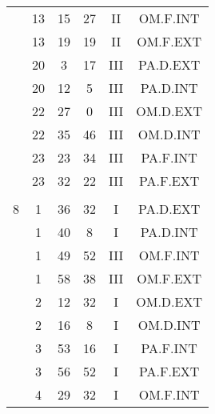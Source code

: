 \documentclass[12pt, a4paper]{article}
\begin{document}
\begin{multicols}{3}
{\begin{tabular}{c c c c c c}
	 	 	 	 & 13 & 15 & 27 & II & OM.F.INT\\%
	 	 	 	 & 13 & 19 & 19 & II & OM.F.EXT\\%
	 	 	 	 & 20 & 3 & 17 & III & PA.D.EXT\\%
	 	 	 	 & 20 & 12 & 5 & III & PA.D.INT\\%
	 	 	 	 & 22 & 27 & 0 & III & OM.D.EXT\\%
	 	 	 	 & 22 & 35 & 46 & III & OM.D.INT\\%
	 	 	 	 & 23 & 23 & 34 & III & PA.F.INT\\%
	 	 	 	 & 23 & 32 & 22 & III & PA.F.EXT\\%
	 	 	 	 & & & & & \\%
	 	 	 	8 & 1 & 36 & 32 & I & PA.D.EXT\\%
	 	 	 	 & 1 & 40 & 8 & I & PA.D.INT\\%
	 	 	 	 & 1 & 49 & 52 & III & OM.F.INT\\%
	 	 	 	 & 1 & 58 & 38 & III & OM.F.EXT\\%
	 	 	 	 & 2 & 12 & 32 & I & OM.D.EXT\\%
	 	 	 	 & 2 & 16 & 8 & I & OM.D.INT\\%
	 	 	 	 & 3 & 53 & 16 & I & PA.F.INT\\%
	 	 	 	 & 3 & 56 & 52 & I & PA.F.EXT\\%
	 	 	 	 & 4 & 29 & 32 & I & OM.F.INT\\%
	 	 \end{tabular}
 	}
\end{multicols}
\end{document}
